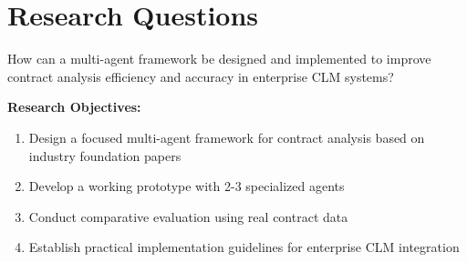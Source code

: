 
\section{Research Questions}\label{section:research_questions}

How can a multi-agent framework be designed and implemented to improve contract analysis efficiency and accuracy in enterprise CLM systems?
\newline
\break

\textbf{Research Objectives:}
\begin{enumerate}
    \item Design a focused multi-agent framework for contract analysis based on industry foundation papers
    \item Develop a working prototype with 2-3 specialized agents
    \item Conduct comparative evaluation using real contract data
    \item Establish practical implementation guidelines for enterprise CLM integration
\end{enumerate}

\break
